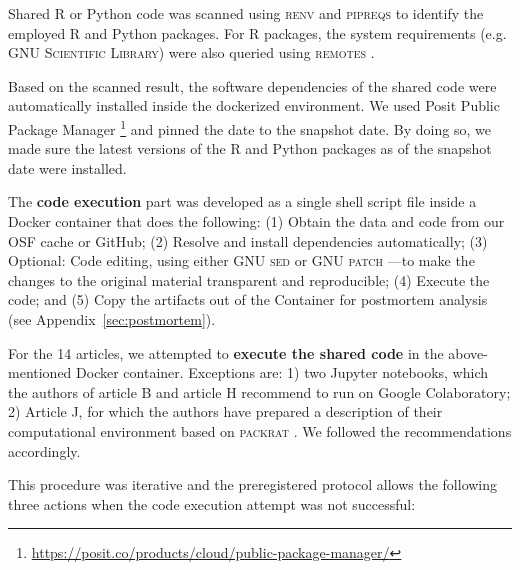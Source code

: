 Shared R or Python code was scanned using \textsc{renv} \parencite[]{renv} and \textsc{pipreqs} \parencite[]{pipreqs} to identify the employed R and Python packages. For R packages, the system requirements (e.g. \textsc{GNU Scientific Library}) were also queried using \textsc{remotes} \parencite[]{remotes}.

Based on the scanned result, the software dependencies of the shared code were automatically installed inside the dockerized environment. We used Posit Public Package Manager \footnote{\url{https://posit.co/products/cloud/public-package-manager/}} and pinned the date to the snapshot date. By doing so, we made sure the latest versions of the R and Python packages as of the snapshot date were installed.


The \textbf{code execution} part was developed as a single shell script file inside a Docker container that does the following: (1) Obtain the data and code from our OSF cache or GitHub; (2) Resolve and install dependencies automatically; (3) Optional: Code editing, using either \textsc{GNU sed} \parencite[]{pizzini2018gnu} or \textsc{GNU patch} \parencite[]{gnupatch}---to make the changes to the original material transparent and reproducible; (4) Execute the code; and (5) Copy the artifacts out of the Container for postmortem analysis (see Appendix~\ref{sec:postmortem}).


For the 14 articles, we attempted to \textbf{execute the shared code} in the above-mentioned Docker container. Exceptions are: 1) two Jupyter notebooks, which the authors of article B and article H recommend to run on Google Colaboratory; 2) Article J, for which the authors have prepared a description of their computational environment based on \textsc{packrat} \parencite[]{packrat}. We followed the recommendations accordingly.

This procedure was iterative and the preregistered protocol allows the following three actions when the code execution attempt was not successful:

